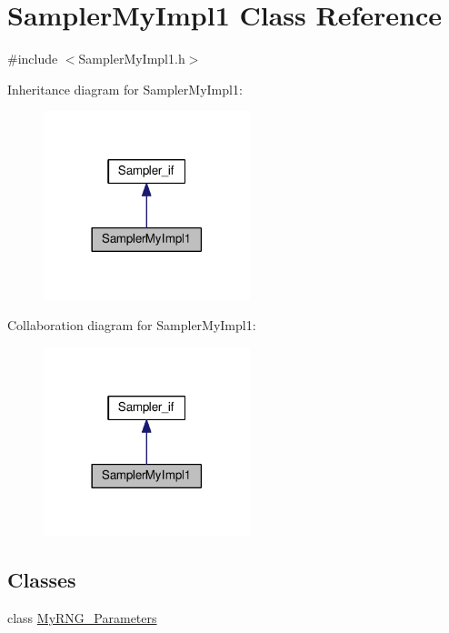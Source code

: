 \hypertarget{class_sampler_my_impl1}{\section{Sampler\-My\-Impl1 Class Reference}
\label{class_sampler_my_impl1}
}


{\ttfamily \#include $<$Sampler\-My\-Impl1.\-h$>$}



Inheritance diagram for Sampler\-My\-Impl1\-:\nopagebreak
\begin{figure}[H]
\begin{center}
\leavevmode
\includegraphics[width=170pt]{class_sampler_my_impl1__inherit__graph}
\end{center}
\end{figure}


Collaboration diagram for Sampler\-My\-Impl1\-:\nopagebreak
\begin{figure}[H]
\begin{center}
\leavevmode
\includegraphics[width=170pt]{class_sampler_my_impl1__coll__graph}
\end{center}
\end{figure}
\subsection*{Classes}
\begin{DoxyCompactItemize}
\item 
class \hyperlink{class_sampler_my_impl1_1_1_my_r_n_g___parameters}{My\-R\-N\-G\-\_\-\-Parameters}
\end{DoxyCompactItemize}
